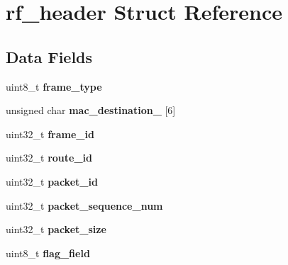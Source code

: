 \hypertarget{structrf__header}{\section{rf\-\_\-header Struct Reference}
\label{structrf__header}
}
\subsection*{Data Fields}
\begin{DoxyCompactItemize}
\item 
\hypertarget{structrf__header_af42eeb1ad8596ecaf7a5cbaa7f82555f}{uint8\-\_\-t {\bfseries frame\-\_\-type}}\label{structrf__header_af42eeb1ad8596ecaf7a5cbaa7f82555f}

\item 
\hypertarget{structrf__header_ac28de24fcf65a38c3eed5453e8ceec66}{unsigned char {\bfseries mac\-\_\-destination\-\_\-} \mbox{[}6\mbox{]}}\label{structrf__header_ac28de24fcf65a38c3eed5453e8ceec66}

\item 
\hypertarget{structrf__header_af349be5e90479b38c9add47fc4aaa3c7}{uint32\-\_\-t {\bfseries frame\-\_\-id}}\label{structrf__header_af349be5e90479b38c9add47fc4aaa3c7}

\item 
\hypertarget{structrf__header_a04f824a98cc8678cfef449f4649a3e9b}{uint32\-\_\-t {\bfseries route\-\_\-id}}\label{structrf__header_a04f824a98cc8678cfef449f4649a3e9b}

\item 
\hypertarget{structrf__header_a0d692a62873a0f28dfcb2779ac754327}{uint32\-\_\-t {\bfseries packet\-\_\-id}}\label{structrf__header_a0d692a62873a0f28dfcb2779ac754327}

\item 
\hypertarget{structrf__header_aae7aa81cd19da8cb4e8ea70f40c36a0f}{uint32\-\_\-t {\bfseries packet\-\_\-sequence\-\_\-num}}\label{structrf__header_aae7aa81cd19da8cb4e8ea70f40c36a0f}

\item 
\hypertarget{structrf__header_a4cd1acb3fbf2cb1c0f11f2407dfe7c1f}{uint32\-\_\-t {\bfseries packet\-\_\-size}}\label{structrf__header_a4cd1acb3fbf2cb1c0f11f2407dfe7c1f}

\item 
\hypertarget{structrf__header_ae3fc20e6a12b2c16dfd6f23067783979}{uint8\-\_\-t {\bfseries flag\-\_\-field}}\label{structrf__header_ae3fc20e6a12b2c16dfd6f23067783979}


\end{DoxyCompactItemize}
